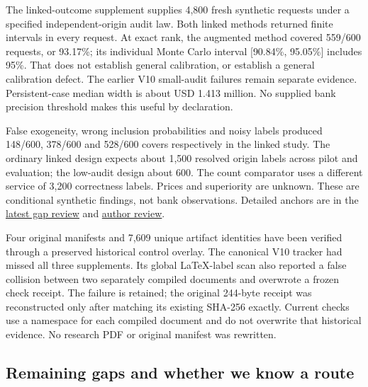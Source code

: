 \documentclass[
  11pt,
  a4paper,
]{article}
\begin{document}
The linked-outcome supplement supplies 4,800 fresh synthetic requests
under a specified independent-origin audit law. Both linked methods
returned finite intervals in every request. At exact rank, the augmented
method covered 559/600 requests, or 93.17\%; its individual Monte Carlo
interval {[}90.84\%, 95.05\%{]} includes 95\%. That does not establish
general calibration, or establish a general calibration defect. The
earlier V10 small-audit failures remain separate evidence.
Persistent-case median width is about USD 1.413 million. No supplied
bank precision threshold makes this useful by declaration.

False exogeneity, wrong inclusion probabilities and noisy labels
produced 148/600, 378/600 and 528/600 covers respectively in the linked
study. The ordinary linked design expects about 1,500 resolved origin
labels across pilot and evaluation; the low-audit design about 600. The
count comparator uses a different service of 3,200 correctness labels.
Prices and superiority are unknown. These are conditional synthetic
findings, not bank observations. Detailed anchors are in the
\href{../reviews/remaining-gaps-linked-funding-2026-10-11.md}{latest gap
review} and
\href{../reviews/linked-funding-author-review-2026-10-11.md}{author
review}.

Four original manifests and 7,609 unique artifact identities have been
verified through a preserved historical control overlay. The canonical
V10 tracker had missed all three supplements. Its global LaTeX-label
scan also reported a false collision between two separately compiled
documents and overwrote a frozen check receipt. The failure is retained;
the original 244-byte receipt was reconstructed only after matching its
existing SHA-256 exactly. Current checks use a namespace for each
compiled document and do not overwrite that historical evidence. No
research PDF or original manifest was rewritten.

\hypertarget{remaining-gaps-and-whether-we-know-a-route}{%
\subsection{Remaining gaps and whether we know a
route}\label{remaining-gaps-and-whether-we-know-a-route}}
\end{document}
